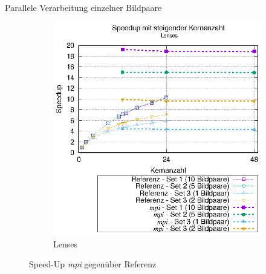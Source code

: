 \begin{frame}{Parallele Verarbeitung einzelner Bildpaare}
\begin{figure}[h]
\begin{subfigure}[b]{0.47\textwidth}
			\includegraphics[width=\textwidth]{pdf/mpi_speedup_lenses}
			\caption{Lenses}
		\end{subfigure}
		\caption{Speed-Up \textit{mpi} gegenüber Referenz}
	\end{figure}
\end{frame}

